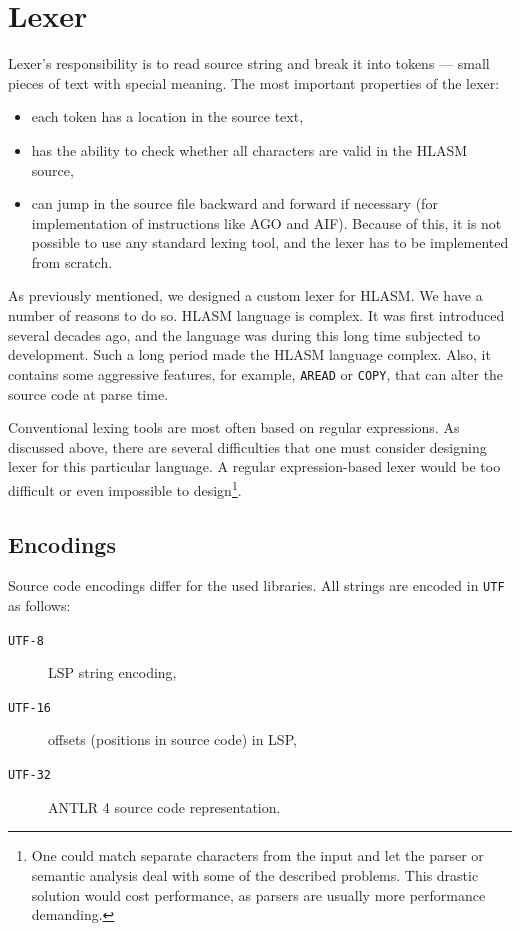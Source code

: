 \section{Lexer}

Lexer's responsibility is to read source string and break it into tokens --- small pieces of text with special meaning. The most important properties of the lexer:
\begin{itemize}
	\item each token has a location in the source text,
	\item has the ability to check whether all characters are valid in the HLASM source,
	\item can jump in the source file backward and forward if necessary (for implementation of instructions like AGO and AIF). Because of this, it is not possible to use any standard lexing tool, and the lexer has to be implemented from scratch.
\end{itemize}

As previously mentioned, we designed a custom lexer for HLASM. We have a number of reasons to do so. HLASM language is complex. It was first introduced several decades ago, and the language was during this long time subjected to development. Such a long period made the HLASM language complex. Also, it contains some aggressive features, for example, \texttt{AREAD} or \texttt{COPY}, that can alter the source code at parse time.

Conventional lexing tools are most often based on regular expressions. As discussed above, there are several difficulties that one must consider designing lexer for this particular language. A regular expression-based lexer would be too difficult or even impossible to design\footnote{One could match separate characters from the input and let the parser or semantic analysis deal with some of the described problems. This drastic solution would cost performance, as parsers are usually more performance demanding.}.

\subsection{Encodings}
Source code encodings differ for the used libraries. All strings are encoded in \texttt{UTF} as follows:

\begin{description}
	\item[\texttt{UTF-8}] LSP string encoding,
	\item[\texttt{UTF-16}] offsets (positions in source code) in LSP,
	\item[\texttt{UTF-32}] ANTLR 4 source code representation.
\end{description}

